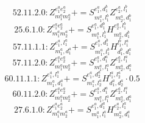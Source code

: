 \documentclass[letterpaper,10pt,fleqn,leqno,onecolumn]{article}
\begin{document}
\begin{equation} \;\;\;\;\;\;  52.11.2.0: Z^{e_{1}^{a}e_{2}^{a}}_{m_{1}^{a}m_{2}^{a}}+=S^{e_{1}^{a},d_{1}^{b}}_{m_{1}^{a},l_{1}^{b}}Z^{e_{2}^{a},l_{1}^{b}}_{m_{2}^{a},d_{1}^{b}} \end{equation}
\begin{equation} \;\;\;\;\;\;  25.6.1.0: Z^{e_{1}^{a}e_{2}^{a}}_{m_{1}^{a}m_{2}^{a}}+=S^{e_{1}^{a},d_{1}^{b}}_{m_{1}^{a},l_{1}^{b}}H^{e_{2}^{a},l_{1}^{b}}_{m_{2}^{a},d_{1}^{b}} \end{equation}
\begin{equation} \;\;\;\;\;\;  57.11.1.1: Z^{e_{1}^{a},l_{1}^{a}}_{m_{1}^{a},d_{1}^{a}}+=S^{e_{1}^{a},d_{1}^{b}}_{m_{1}^{a},l_{1}^{b}}H^{l_{1}^{b},l_{1}^{a}}_{d_{1}^{b},d_{1}^{a}} \end{equation}
\begin{equation} \;\;\;\;\;\;  57.11.2.0: Z^{e_{1}^{a}e_{2}^{a}}_{m_{1}^{a}m_{2}^{a}}+=S^{e_{1}^{a},d_{1}^{a}}_{m_{1}^{a},l_{1}^{a}}Z^{e_{2}^{a},l_{1}^{a}}_{m_{2}^{a},d_{1}^{a}} \end{equation}
\begin{equation} \;\;\;\;\;\;  60.11.1.1: Z^{e_{1}^{a},l_{1}^{a}}_{m_{1}^{a},d_{1}^{a}}+=S^{e_{1}^{a},d_{2}^{a}}_{m_{1}^{a},l_{2}^{a}}H^{l_{1}^{a},l_{2}^{a}}_{d_{1}^{a},d_{2}^{a}}\cdot 0.5 \end{equation}
\begin{equation} \;\;\;\;\;\;  60.11.2.0: Z^{e_{1}^{a}e_{2}^{a}}_{m_{1}^{a}m_{2}^{a}}+=S^{e_{1}^{a},d_{1}^{a}}_{m_{1}^{a},l_{1}^{a}}Z^{e_{2}^{a},l_{1}^{a}}_{m_{2}^{a},d_{1}^{a}} \end{equation}
\begin{equation} \;\;\;\;\;\;  27.6.1.0: Z^{e_{1}^{a}e_{2}^{a}}_{m_{1}^{a}m_{2}^{a}}+=S^{e_{1}^{a},d_{1}^{a}}_{m_{1}^{a},l_{1}^{a}}H^{e_{2}^{a},l_{1}^{a}}_{m_{2}^{a},d_{1}^{a}} \end{equation}
\end{document}
